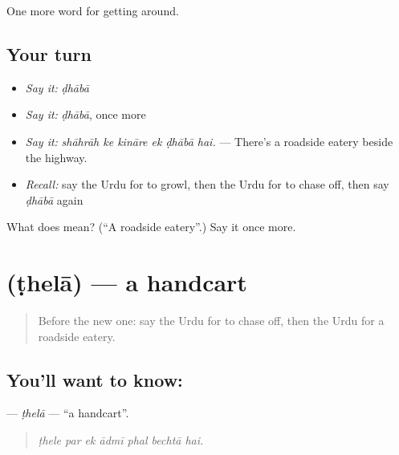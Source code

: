 \begin{grammarlens}[title={What you've built}]
One more word for getting around.
\end{grammarlens}

\subsection*{Your turn}
\begin{itemize}
\raggedright
  \item \emph{Say it:} \emph{ḍhābā}
  \item \emph{Say it:} \emph{ḍhābā}, once more
  \item \emph{Say it:} \emph{shāhrāh ke kināre ek ḍhābā hai.} — There's a roadside eatery beside the highway.
  \item \emph{Recall:} say the Urdu for to growl, then the Urdu for to chase off, then say \emph{ḍhābā} again
\end{itemize}

\begin{tcolorbox}[breakable,colback=teal!4,colframe=teal!35!black,title={Before you move on}]
What does  mean? (\textquotedblleft{}A roadside eatery\textquotedblright{}.) Say it once more.
\end{tcolorbox}
\section[\texorpdfstring{\ur{ٹھیلا} (ṭhelā)}{ٹھیلا (ṭhelā)}]{ (ṭhelā) — a handcart}

\label{lesson:UR-C415-thela}



\begin{quote}
Before the new one: say the Urdu for to chase off, then the Urdu for a roadside eatery.
\end{quote}

\subsection*{You'll want to know: }
\textbf{} — \emph{ṭhelā} — \textquotedblleft{}a handcart\textquotedblright{}.

\begin{quote}
      
\end{quote}

\begin{quote}
\emph{ṭhele par ek ādmī phal bechtā hai.}
\end{quote}


